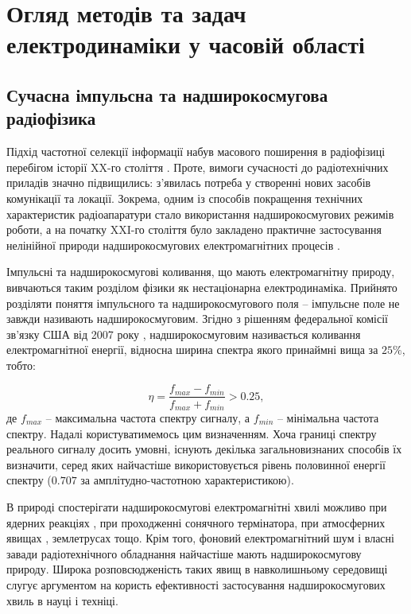 \chapter{Огляд методів та задач електродинаміки у часовій області}
\label{ch:review}

\section{Сучасна імпульсна та надширокосмугова радіофізика}

Підхід частотної селекції інформації набув масового поширення в радіофізиці
перебігом історії XX-го століття \cite{imp:Nosich2001}. Проте, вимоги 
сучасності до радіотехнічних приладів значно підвищились: з'явилась потреба 
у створенні нових засобів комунікації та локації. Зокрема, одним із 
способів покращення технічних характеристик радіоапаратури стало 
використання надширокосмугових режимів роботи, а на початку XXI-го 
століття було закладено практичне застосування нелінійної природи 
надширокосмугових електромагнітних процесів \cite{imp:Chernogor2008}.

Імпульсні та надширокосмугові коливання, що мають електромагнітну природу, 
вивчаються таким розділом фізики як нестаціонарна електродинаміка. Прийнято 
розділяти поняття імпульсного та надширокосмугового поля -- імпульсне поле 
не завжди називають надширокосмуговим. Згідно з рішенням федеральної 
комісії зв'язку США від 2007 року \cite{imp:RadarStandard2007}, 
надширокосмуговим називається коливання електромагнітної енергії, 
відносна ширина спектра якого принаймні вища за $ 25\% $, тобто:

\begin{equation} \label{eq:spectum_width}
\eta = \frac{f_{max} - f_{min}}{f_{max} + f_{min}} > 0.25,
\end{equation}
%
де $ f_{max} $ -- максимальна частота спектру сигналу, а $ f_{min} $ -- 
мінімальна частота спектру. Надалі користуватимемось цим визначенням. 
Хоча границі спектру реального сигналу досить умовні, існують декілька 
загальновизнаних способів їх визначити, серед яких найчастіше 
використовується рівень половинної енергії спектру ($ 0.707 $ за 
амплітудно-частотною характеристикою).

В природі спостерігати надширокосмугові електромагнітні хвилі можливо при 
ядерних реакціях \cite{imp:Baum2007}, при проходженні сонячного термінатора, 
при атмосферних явищах \cite{imp:Uman2006}, землетрусах 
\cite{imp:Hayakawa2008} тощо. Крім того, фоновий електромагнітний шум і 
власні завади радіотехнічного обладнання найчастіше мають 
надширокосмугову природу. Широка розповсюдженість таких явищ в 
навколишньому середовищі слугує аргументом на користь ефективності 
застосування надширокосмугових хвиль в науці і техніці.

